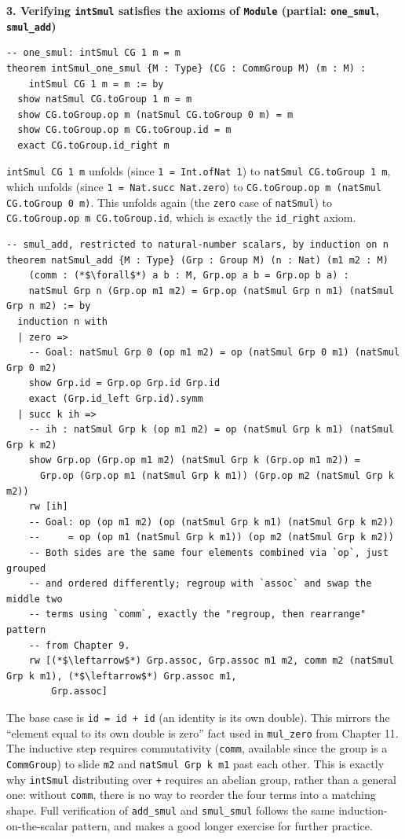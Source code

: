 \textbf{3. Verifying \texttt{intSmul} satisfies the axioms of \texttt{Module} (partial: \texttt{one\_\allowbreak{}smul}, \texttt{smul\_\allowbreak{}add})}

\begin{lstlisting}
-- one_smul: intSmul CG 1 m = m
theorem intSmul_one_smul {M : Type} (CG : CommGroup M) (m : M) :
    intSmul CG 1 m = m := by
  show natSmul CG.toGroup 1 m = m
  show CG.toGroup.op m (natSmul CG.toGroup 0 m) = m
  show CG.toGroup.op m CG.toGroup.id = m
  exact CG.toGroup.id_right m
\end{lstlisting}

\texttt{intSmul CG 1 m} unfolds (since \texttt{1 = Int.ofNat 1}) to \texttt{natSmul CG.toGroup 1 m}, which unfolds (since \texttt{1 = Nat.succ Nat.zero}) to \texttt{CG.toGroup.op m (natSmul CG.toGroup 0 m)}. This unfolds again (the \texttt{zero} case of \texttt{natSmul}) to \texttt{CG.toGroup.op m CG.toGroup.id}, which is exactly the \texttt{id\_\allowbreak{}right} axiom.

\begin{lstlisting}
-- smul_add, restricted to natural-number scalars, by induction on n
theorem natSmul_add {M : Type} (Grp : Group M) (n : Nat) (m1 m2 : M)
    (comm : (*$\forall$*) a b : M, Grp.op a b = Grp.op b a) :
    natSmul Grp n (Grp.op m1 m2) = Grp.op (natSmul Grp n m1) (natSmul Grp n m2) := by
  induction n with
  | zero =>
    -- Goal: natSmul Grp 0 (op m1 m2) = op (natSmul Grp 0 m1) (natSmul Grp 0 m2)
    show Grp.id = Grp.op Grp.id Grp.id
    exact (Grp.id_left Grp.id).symm
  | succ k ih =>
    -- ih : natSmul Grp k (op m1 m2) = op (natSmul Grp k m1) (natSmul Grp k m2)
    show Grp.op (Grp.op m1 m2) (natSmul Grp k (Grp.op m1 m2)) =
      Grp.op (Grp.op m1 (natSmul Grp k m1)) (Grp.op m2 (natSmul Grp k m2))
    rw [ih]
    -- Goal: op (op m1 m2) (op (natSmul Grp k m1) (natSmul Grp k m2))
    --     = op (op m1 (natSmul Grp k m1)) (op m2 (natSmul Grp k m2))
    -- Both sides are the same four elements combined via `op`, just grouped
    -- and ordered differently; regroup with `assoc` and swap the middle two
    -- terms using `comm`, exactly the "regroup, then rearrange" pattern
    -- from Chapter 9.
    rw [(*$\leftarrow$*) Grp.assoc, Grp.assoc m1 m2, comm m2 (natSmul Grp k m1), (*$\leftarrow$*) Grp.assoc m1,
        Grp.assoc]
\end{lstlisting}

The base case is \texttt{id = id + id} (an identity is its own double). This mirrors the ``element equal to its own double is zero'' fact used in \texttt{mul\_\allowbreak{}zero} from Chapter 11. The inductive step requires commutativity (\texttt{comm}, available since the group is a \texttt{CommGroup}) to slide \texttt{m2} and \texttt{natSmul Grp k m1} past each other. This is exactly why \texttt{intSmul} distributing over \texttt{+} requires an abelian group, rather than a general one: without \texttt{comm}, there is no way to reorder the four terms into a matching shape. Full verification of \texttt{add\_\allowbreak{}smul} and \texttt{smul\_\allowbreak{}smul} follows the same induction-on-the-scalar pattern, and makes a good longer exercise for further practice.


